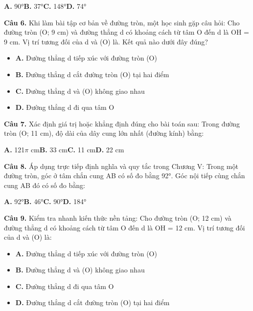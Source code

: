 \documentclass[11pt,a4paper]{article}
\begin{document}
\hspace*{1.5em}\textbf{A.} 90°\quad\quad \textbf{B.} 37°\quad\quad \textbf{C.} 148°\quad\quad \textbf{D.} 74°\par\vspace{2pt}
\textbf{\color{primary} Câu 6.} Khi làm bài tập cơ bản về đường tròn, một học sinh gặp câu hỏi: Cho đường tròn (O; 9 cm) và đường thẳng d có khoảng cách từ tâm O đến d là OH = 9 cm. Vị trí tương đối của d và (O) là. Kết quả nào dưới đây đúng?\par
\begin{itemize}\setlength{\itemsep}{1pt}\setlength{\parskip}{0pt}
  \item[] \textbf{A.} Đường thẳng d tiếp xúc với đường tròn (O)
  \item[] \textbf{B.} Đường thẳng d cắt đường tròn (O) tại hai điểm
  \item[] \textbf{C.} Đường thẳng d và (O) không giao nhau
  \item[] \textbf{D.} Đường thẳng d đi qua tâm O
\end{itemize}\vspace{2pt}
\textbf{\color{primary} Câu 7.} Xác định giá trị hoặc khẳng định đúng cho bài toán sau: Trong đường tròn (O; 11 cm), độ dài của dây cung lớn nhất (đường kính) bằng:\par
\hspace*{1.5em}\textbf{A.} 121$\pi$ cm\quad\quad \textbf{B.} 33 cm\quad\quad \textbf{C.} 11 cm\quad\quad \textbf{D.} 22 cm\par\vspace{2pt}
\textbf{\color{primary} Câu 8.} Áp dụng trực tiếp định nghĩa và quy tắc trong Chương V: Trong một đường tròn, góc ở tâm chắn cung AB có số đo bằng 92°. Góc nội tiếp cùng chắn cung AB đó có số đo bằng:\par
\hspace*{1.5em}\textbf{A.} 92°\quad\quad \textbf{B.} 46°\quad\quad \textbf{C.} 90°\quad\quad \textbf{D.} 184°\par\vspace{2pt}
\textbf{\color{primary} Câu 9.} Kiểm tra nhanh kiến thức nền tảng: Cho đường tròn (O; 12 cm) và đường thẳng d có khoảng cách từ tâm O đến d là OH = 12 cm. Vị trí tương đối của d và (O) là:\par
\begin{itemize}\setlength{\itemsep}{1pt}\setlength{\parskip}{0pt}
  \item[] \textbf{A.} Đường thẳng d tiếp xúc với đường tròn (O)
  \item[] \textbf{B.} Đường thẳng d và (O) không giao nhau
  \item[] \textbf{C.} Đường thẳng d đi qua tâm O
  \item[] \textbf{D.} Đường thẳng d cắt đường tròn (O) tại hai điểm
\end{itemize}\vspace{2pt}
\end{document}
